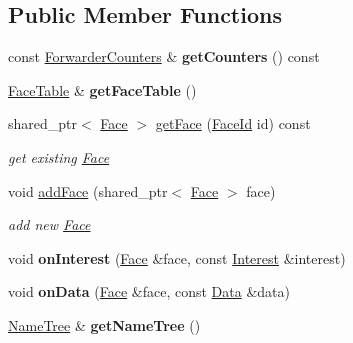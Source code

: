 \subsection*{Public Member Functions}
\begin{DoxyCompactItemize}
\item 
const \hyperlink{classnfd_1_1ForwarderCounters}{Forwarder\+Counters} \& {\bfseries get\+Counters} () const\hypertarget{classnfd_1_1Forwarder_a0d28ae1afcef34b9103a22b0fbe37c9f}{}\label{classnfd_1_1Forwarder_a0d28ae1afcef34b9103a22b0fbe37c9f}

\item 
\hyperlink{classnfd_1_1FaceTable}{Face\+Table} \& {\bfseries get\+Face\+Table} ()\hypertarget{classnfd_1_1Forwarder_ae457ae693bfe5b6ac937d46409b7bd1f}{}\label{classnfd_1_1Forwarder_ae457ae693bfe5b6ac937d46409b7bd1f}

\item 
shared\+\_\+ptr$<$ \hyperlink{classnfd_1_1Face}{Face} $>$ \hyperlink{classnfd_1_1Forwarder_a25d89deb4f9fee7afe743bcbb4546ff8}{get\+Face} (\hyperlink{classFaceId}{Face\+Id} id) const
\begin{DoxyCompactList}\small\item\em get existing \hyperlink{classnfd_1_1Face}{Face} \end{DoxyCompactList}\item 
void \hyperlink{classnfd_1_1Forwarder_a625af8804bc0fece52a6dcb341998152}{add\+Face} (shared\+\_\+ptr$<$ \hyperlink{classnfd_1_1Face}{Face} $>$ face)
\begin{DoxyCompactList}\small\item\em add new \hyperlink{classnfd_1_1Face}{Face} \end{DoxyCompactList}\item 
void {\bfseries on\+Interest} (\hyperlink{classnfd_1_1Face}{Face} \&face, const \hyperlink{classndn_1_1Interest}{Interest} \&interest)\hypertarget{classnfd_1_1Forwarder_aba2f040540885a671a2a240a97724f57}{}\label{classnfd_1_1Forwarder_aba2f040540885a671a2a240a97724f57}

\item 
void {\bfseries on\+Data} (\hyperlink{classnfd_1_1Face}{Face} \&face, const \hyperlink{classndn_1_1Data}{Data} \&data)\hypertarget{classnfd_1_1Forwarder_af9b64009ed9b25a0f9dd6e8c82608210}{}\label{classnfd_1_1Forwarder_af9b64009ed9b25a0f9dd6e8c82608210}

\item 
\hyperlink{classnfd_1_1NameTree}{Name\+Tree} \& {\bfseries get\+Name\+Tree} ()\hypertarget{classnfd_1_1Forwarder_a587bc5a290ba03893a86453200fb0ed9}{}\label{classnfd_1_1Forwarder_a587bc5a290ba03893a86453200fb0ed9}


\end{DoxyCompactItemize}
